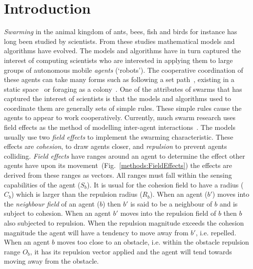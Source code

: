 \documentclass{ieeeaccess}
\begin{document}
\titlepgskip=-15pt
\maketitle

\section{Introduction}\label{sec:ConcaveReduction}
\textit{Swarming} in the animal kingdom of ants, bees, fish and birds for instance has long been studied by scientists. From these studies mathematical models and algorithms have evolved. The models and algorithms have in turn captured the interest of computing scientists who are interested in applying them to large groups of autonomous mobile \textit{agents} (`robots'). The cooperative coordination of these agents can take many forms such as following a set path~\cite{HCS:09}, existing in a static space~\cite{EP:10, GP:02, GP:04} or foraging as a colony~\cite{HER:11, GK:07}. One of the attributes of swarms that has captured the interest of scientists is that the models and algorithms used to coordinate them are generally sets of simple rules. These simple rules cause the agents to appear to work cooperatively.
Currently, much swarm research uses field effects as the method of modelling inter-agent interactions~\cite{BAF:06, BAFVM:06, BM:09, APZDAMC:09, GP:02, GP:04, GP:04a, GP:05, GP:11, MYP:09}. The models usually use two \textit{field effects} to implement the swarming characteristic. These effects are \textit{cohesion}, to draw agents closer, and \textit{repulsion} to prevent agents colliding. \textit{Field effects} have ranges around an agent to determine the effect other agents have upon its movement~(Fig.~\ref{methods:FieldEffects}) the effects are derived from these ranges as vectors. All ranges must fall within the sensing capabilities of the agent ($S_b$). It is usual for the cohesion field to have a radius ($C_b$) which is larger than the repulsion radius ($R_b$). When an agent ($b'$) moves into the \textit{neighbour field} of an agent ($b$) then $b'$ is said to be a neighbour of $b$ and is subject to cohesion. When an agent $b'$ moves into the repulsion field of $b$ then $b$ also subjected to repulsion. When the repulsion magnitude exceeds the cohesion magnitude the agent will have a tendency to move away from $b'$, i.e. repelled. When an agent $b$ moves too close to an obstacle, i.e. within the obstacle repulsion range $O_b$, it has its repulsion vector applied and the agent will tend towards moving away from the obstacle.
\end{document}
